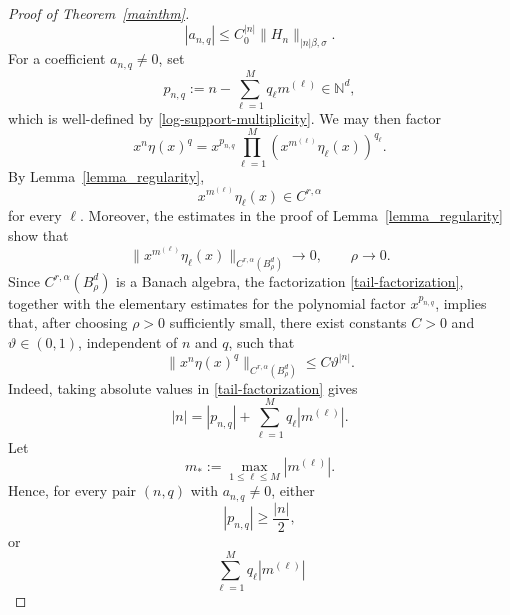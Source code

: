 \documentclass{amsart}
\theoremstyle{plain}
\theoremstyle{definition}
\begin{document}
\begin{proof}[Proof of Theorem~\ref{mainthm}]
\begin{equation}
    |a_{n,q}|
    \leq
    C_0^{|n|}
    \|H_n\|_{|n|\beta,\sigma}.
    \label{coefficient-bound}
\end{equation} For a coefficient $a_{n,q}\neq0$, set
\begin{equation}
    p_{n,q}
    :=
    n-\sum_{\ell=1}^M q_\ell m^{(\ell)}
    \in\mathbb{N}^d,
\end{equation}
which is well-defined by \eqref{log-support-multiplicity}. We may
then factor
\begin{equation}
    x^n\eta(x)^q
    =
    x^{p_{n,q}}
    \prod_{\ell=1}^M
    \left(
        x^{m^{(\ell)}}\eta_\ell(x)
    \right)^{q_\ell}.
    \label{tail-factorization}
\end{equation}
By Lemma~\ref{lemma_regularity},
\begin{equation}
    x^{m^{(\ell)}}\eta_\ell(x)
    \in C^{r,\alpha}
\end{equation}
for every $\ell$. Moreover, the estimates in the proof of
Lemma~\ref{lemma_regularity} show that
\begin{equation}
    \bigl\|
        x^{m^{(\ell)}}\eta_\ell(x)
    \bigr\|_{C^{r,\alpha}(B_\rho^d)}
    \longrightarrow0,
    \qquad
    \rho\longrightarrow0.
    \label{log-factor-small}
\end{equation}
Since $C^{r,\alpha}(B_\rho^d)$ is a Banach algebra, the
factorization \eqref{tail-factorization}, together with the
elementary estimates for the polynomial factor $x^{p_{n,q}}$,
implies that, after choosing $\rho>0$ sufficiently small, there
exist constants $C>0$ and $\vartheta\in(0,1)$, independent of
$n$ and $q$, such that
\begin{equation}
    \bigl\|
        x^n\eta(x)^q
    \bigr\|_{C^{r,\alpha}(B_\rho^d)}
    \leq
    C\vartheta^{|n|}.
    \label{monomial-tail-estimate}
\end{equation}
Indeed, taking absolute values in \eqref{tail-factorization} gives
\begin{equation}
    |n|
    =
    |p_{n,q}|
    +
    \sum_{\ell=1}^M q_\ell |m^{(\ell)}|.
\end{equation}
Let
\begin{equation}
    m_*:=\max_{1\leq \ell\leq M}|m^{(\ell)}|.
\end{equation}
Hence, for every pair $(n,q)$ with $a_{n,q}\neq0$, either
\begin{equation}
    |p_{n,q}|\geq \frac{|n|}{2},
\end{equation}
or
\begin{equation}
    \sum_{\ell=1}^M q_\ell |m^{(\ell)}|

\end{equation}
\end{proof}
\end{document}
